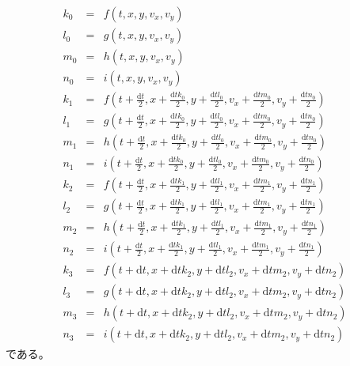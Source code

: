 \documentclass[a4paper,twoside]{jarticle}
\begin{document}
\begin{eqnarray}
  k_0&=&f\left(t,x,y,v_x,v_y\right)\\
  l_0&=&g\left(t,x,y,v_x,v_y\right)\\
  m_0&=&h\left(t,x,y,v_x,v_y\right)\\
  n_0&=&i\left(t,x,y,v_x,v_y\right)\\
  k_1&=&f\left(t+\frac{\mathrm{d}t}{2},x+\frac{\mathrm{d}tk_0}{2},y+\frac{\mathrm{d}tl_0}{2},v_x+\frac{\mathrm{d}tm_0}{2},v_y+\frac{\mathrm{d}tn_0}{2}\right)\\
  l_1&=&g\left(t+\frac{\mathrm{d}t}{2},x+\frac{\mathrm{d}tk_0}{2},y+\frac{\mathrm{d}tl_0}{2},v_x+\frac{\mathrm{d}tm_0}{2},v_y+\frac{\mathrm{d}tn_0}{2}\right)\\
  m_1&=&h\left(t+\frac{\mathrm{d}t}{2},x+\frac{\mathrm{d}tk_0}{2},y+\frac{\mathrm{d}tl_0}{2},v_x+\frac{\mathrm{d}tm_0}{2},v_y+\frac{\mathrm{d}tn_0}{2}\right)\\
  n_1&=&i\left(t+\frac{\mathrm{d}t}{2},x+\frac{\mathrm{d}tk_0}{2},y+\frac{\mathrm{d}tl_0}{2},v_x+\frac{\mathrm{d}tm_0}{2},v_y+\frac{\mathrm{d}tn_0}{2}\right)\\
  k_2&=&f\left(t+\frac{\mathrm{d}t}{2},x+\frac{\mathrm{d}tk_1}{2},y+\frac{\mathrm{d}tl_1}{2},v_x+\frac{\mathrm{d}tm_1}{2},v_y+\frac{\mathrm{d}tn_1}{2}\right)\\
  l_2&=&g\left(t+\frac{\mathrm{d}t}{2},x+\frac{\mathrm{d}tk_1}{2},y+\frac{\mathrm{d}tl_1}{2},v_x+\frac{\mathrm{d}tm_1}{2},v_y+\frac{\mathrm{d}tn_1}{2}\right)\\
  m_2&=&h\left(t+\frac{\mathrm{d}t}{2},x+\frac{\mathrm{d}tk_1}{2},y+\frac{\mathrm{d}tl_1}{2},v_x+\frac{\mathrm{d}tm_1}{2},v_y+\frac{\mathrm{d}tn_1}{2}\right)\\
  n_2&=&i\left(t+\frac{\mathrm{d}t}{2},x+\frac{\mathrm{d}tk_1}{2},y+\frac{\mathrm{d}tl_1}{2},v_x+\frac{\mathrm{d}tm_1}{2},v_y+\frac{\mathrm{d}tn_1}{2}\right)\\
  k_3&=&f\left(t+\mathrm{d}t,x+\mathrm{d}tk_2,y+\mathrm{d}tl_2,v_x+\mathrm{d}tm_2,v_y+\mathrm{d}tn_2\right)\\
  l_3&=&g\left(t+\mathrm{d}t,x+\mathrm{d}tk_2,y+\mathrm{d}tl_2,v_x+\mathrm{d}tm_2,v_y+\mathrm{d}tn_2\right)\\
  m_3&=&h\left(t+\mathrm{d}t,x+\mathrm{d}tk_2,y+\mathrm{d}tl_2,v_x+\mathrm{d}tm_2,v_y+\mathrm{d}tn_2\right)\\
  n_3&=&i\left(t+\mathrm{d}t,x+\mathrm{d}tk_2,y+\mathrm{d}tl_2,v_x+\mathrm{d}tm_2,v_y+\mathrm{d}tn_2\right)
\end{eqnarray}
\normalsize
である。
\end{document}
